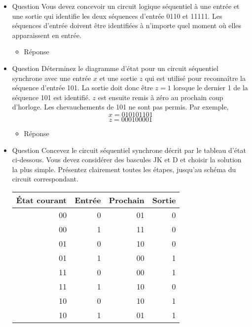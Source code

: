 \documentclass[letter, oneside]{book}
\begin{document}
\begin{itemize}
\item Question
\label{sec:orgac514e8}
Vous devez concevoir un circuit logique séquentiel à une entrée et
une sortie qui identifie les deux séquences d'entrée 0110
et 11111. Les séquences d'entrée doivent être identifiées à
n'importe quel moment où elles apparaissent en entrée.

\begin{itemize}
\item Réponse
\label{sec:org3e618ad}
\begin{center}

\end{center}
\end{itemize}

\item Question
\label{sec:orgfbf8cb4}
Déterminez le diagramme d'état pour un circuit séquentiel synchrone
avec une entrée \(x\) et une sortie \(z\) qui est utilisé pour
reconnaître la séquence d'entrée 101. La sortie doit donc être \(z=1\)
lorsque le dernier 1 de la séquence 101 est identifié. \(z\) est
ensuite remis à zéro au prochain coup d'horloge. Les chevauchements de
101 ne sont pas permis. Par exemple, $$x = 010101101$$ $$z =
000100001$$

\begin{itemize}
\item Réponse
\label{sec:org278517c}
\begin{center}

\end{center}
\end{itemize}

\item Question
\label{sec:orgbbb6a94}
Concevez le circuit séquentiel synchrone décrit par le tableau d'état
ci-dessous. Vous devez considérer des bascules JK et D et choisir la
solution la plus simple. Présentez clairement toutes les étapes,
jusqu'au schéma du circuit correspondant.

\begin{center}
\begin{tabular}{rrrr}
État courant & Entrée & Prochain & Sortie\\[0pt]
\hline
00 & 0 & 01 & 0\\[0pt]
00 & 1 & 11 & 0\\[0pt]
01 & 0 & 10 & 0\\[0pt]
01 & 1 & 00 & 1\\[0pt]
11 & 0 & 00 & 1\\[0pt]
11 & 1 & 10 & 0\\[0pt]
10 & 0 & 10 & 1\\[0pt]
10 & 1 & 01 & 1\\[0pt]
\end{tabular}
\end{center}


\end{itemize}
\end{document}
